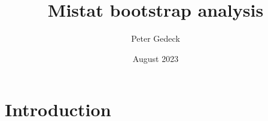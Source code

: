 \documentclass{article}
\title{Mistat bootstrap analysis}
\author{Peter Gedeck}
\date{August 2023}
\begin{document}
\maketitle

\section{Introduction}
\end{document}
